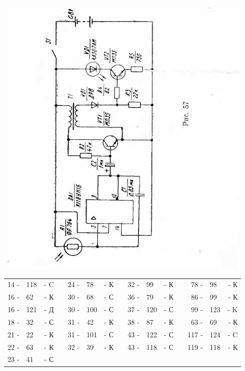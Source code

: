 \documentclass[12pt]{article}
\begin{document}
\newpage

\includegraphics[scale=1.25, angle=1]{ekon3_057_1}

\newpage

\hrulefill

\begin{tabular}{r l r p{0.5cm} r l r p{0.5cm} r l r p{0.5cm} r l r}
14 - & 118 & - C &   & 24 - & 78 & - К &   & 32 - &  99 & - К &   &  78 - &  98  & - К\\
16 - &  62 & - К &   & 30 - & 68 & - С &   & 36 - &  79 & - К &   &  86 - &  99  & - К\\
16 - & 121 & - Д &   & 30 - &100 & - С &   & 37 - & 120 & - С &   &  99 - & 123  & - K\\
18 - &  32 & - С &   & 31 - & 42 & - К &   & 38 - &  87 & - К &   &  63 - &  69  & - К\\
21 - &  22 & - К &   & 31 - &101 & - С &   & 43 - & 122 & - С &   & 117 - & 124  & - C\\
22 - &  63 & - К &   & 32 - & 39 & - К &   & 43 - & 118 & - С &   & 119 - & 118  & - К\\
23 - &  41 & - С &   &      &    &     &   &      &     &     &   &       &      &    \\
\end{tabular}
\end{document}
